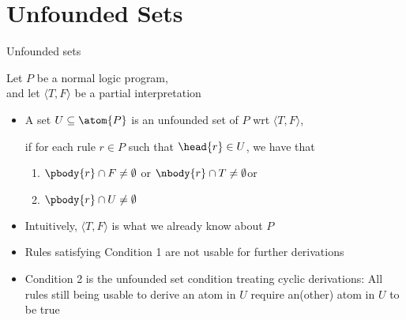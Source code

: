 \section{Unfounded Sets}
\begin{frame}{Unfounded sets}

  Let $P$ be a normal logic program,\\ and
  let $\langle T,F \rangle$ be a partial interpretation

  \begin{itemize}
  \item<2-> A set $U \subseteq \atom{P}$ is an \alert{unfounded set} of $P$
    wrt $\langle T,F \rangle$\pause[4],

    if for each rule $r\in P$ such that $\head{r}\in U$\pause[5], we have that

    \begin{enumerate}
    \item<6-> $\pbody{r} \cap F \neq \emptyset$ or $\nbody{r} \cap T \neq \emptyset$\pause[8] or
    \item<8-> $\pbody{r} \cap U \neq \emptyset$
    \end{enumerate}

  \item<3> Intuitively, $\langle T,F \rangle$ is what we already know about $P$
  \item<7> Rules satisfying Condition 1 are not usable for further derivations
  \item<9-> Condition 2 is the unfounded set condition treating cyclic derivations:
    \alert{All rules still being usable to derive an atom in $U$ require an(other) atom in $U$ to be true}
  \end{itemize}
\end{frame}
